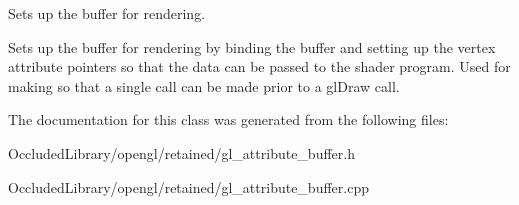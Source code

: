 Sets up the buffer for rendering. 

Sets up the buffer for rendering by binding the buffer and setting up the vertex attribute pointers so that the data can be passed to the shader program. Used for making so that a single call can be made prior to a gl\+Draw call. 

The documentation for this class was generated from the following files\+:\begin{DoxyCompactItemize}
\item 
Occluded\+Library/opengl/retained/gl\+\_\+attribute\+\_\+buffer.\+h\item 
Occluded\+Library/opengl/retained/gl\+\_\+attribute\+\_\+buffer.\+cpp\end{DoxyCompactItemize}
